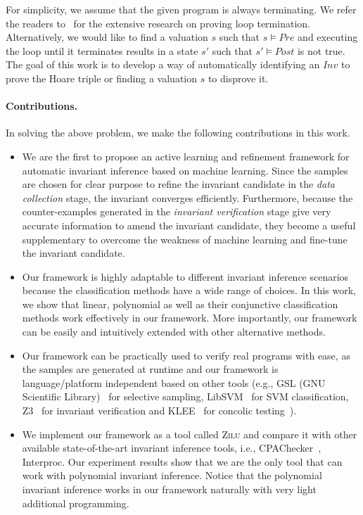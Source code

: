 For simplicity, we assume that the given program is always terminating. We refer the readers to~\cite{} for the extensive research on proving loop termination.
Alternatively, we would like to find a valuation $s$ such that $s \models \mathit{Pre}$ and executing the loop until it terminates results in a state $s'$ such that $s' \models \mathit{Post}$ is not true. The goal of this work is to develop a way of automatically identifying an $\mathit{Inv}$ to prove the Hoare triple or finding a valuation $s$ to disprove it.

\paragraph{Contributions.} In solving the above problem, we make the following contributions in this work.
\begin{itemize}
    \item
    We are the first to propose an active learning and refinement framework
    for automatic invariant inference based on machine learning.
    Since the samples are chosen for clear purpose
    to refine the invariant candidate in the \emph{data collection} stage,
    the invariant converges efficiently.
    Furthermore, because the counter-examples generated in the \emph{invariant verification} stage
    give very accurate information to amend the invariant candidate,
    they become a useful supplementary to overcome the weakness of machine learning
    and fine-tune the invariant candidate.
    \item
    Our framework is highly adaptable to different invariant inference scenarios
    because the classification methods have a wide range of choices.
    In this work, we show that linear, polynomial as well as
    their conjunctive classification methods work effectively in our framework.
    More importantly, our framework can be easily and intuitively extended with other alternative methods.
    \item
    Our framework can be practically used to verify real programs with ease,
    as the samples are generated at runtime
    and our framework is language/platform independent based on other tools
    (e.g., GSL (GNU Scientific Library)~\cite{gough2009gnu} for selective sampling,
    LibSVM~\cite{chang2011libsvm} for SVM classification,
    Z3~\cite{de2008z3} for invariant verification
    and KLEE~\cite{cadar2008klee} for concolic testing~\cite{sen2007concolic}).
    \item
    We implement our framework as a tool called \textsc{Zilu}
    and compare it with other available state-of-the-art invariant inference tools,
    i.e., CPAChecker~\cite{beyer2011cpachecker}, Interproc.
    Our experiment results show that
    we are the only tool that can work with polynomial invariant inference.
    Notice that the polynomial invariant inference works in our framework
    naturally with very light additional programming.
\end{itemize}


